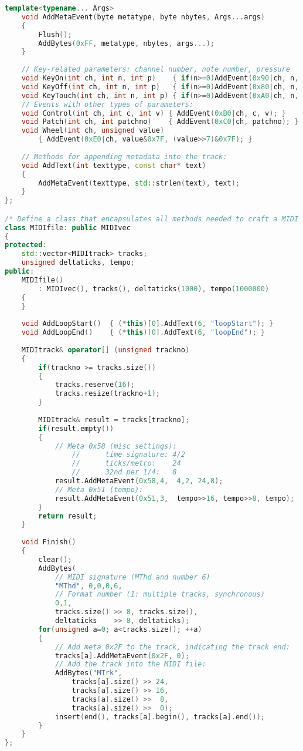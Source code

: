 \documentclass[a4paper]{report}
\begin{document}
\begin{lstlisting}[language=C++, caption=CPP MIDI,captionpos=b]
    template<typename... Args>
    void AddMetaEvent(byte metatype, byte nbytes, Args...args)
    {
        Flush();
        AddBytes(0xFF, metatype, nbytes, args...);
    }
    
    // Key-related parameters: channel number, note number, pressure
    void KeyOn(int ch, int n, int p)    { if(n>=0)AddEvent(0x90|ch, n, p); }
    void KeyOff(int ch, int n, int p)   { if(n>=0)AddEvent(0x80|ch, n, p); }
    void KeyTouch(int ch, int n, int p) { if(n>=0)AddEvent(0xA0|ch, n, p); }
    // Events with other types of parameters:
    void Control(int ch, int c, int v) { AddEvent(0xB0|ch, c, v); }
    void Patch(int ch, int patchno)    { AddEvent(0xC0|ch, patchno); }
    void Wheel(int ch, unsigned value)
        { AddEvent(0xE0|ch, value&0x7F, (value>>7)&0x7F); }
    
    // Methods for appending metadata into the track:
    void AddText(int texttype, const char* text)
    {
        AddMetaEvent(texttype, std::strlen(text), text);
    }
};

/* Define a class that encapsulates all methods needed to craft a MIDI file. */
class MIDIfile: public MIDIvec
{
protected:
    std::vector<MIDItrack> tracks;
    unsigned deltaticks, tempo;
public:
    MIDIfile()
        : MIDIvec(), tracks(), deltaticks(1000), tempo(1000000)
    {
    }
    
    void AddLoopStart()  { (*this)[0].AddText(6, "loopStart"); }
    void AddLoopEnd()    { (*this)[0].AddText(6, "loopEnd"); }
    
    MIDItrack& operator[] (unsigned trackno)
    {
        if(trackno >= tracks.size())
        {
            tracks.reserve(16);
            tracks.resize(trackno+1);
        }
        
        MIDItrack& result = tracks[trackno];
        if(result.empty())
        {
            // Meta 0x58 (misc settings):
                //      time signature: 4/2
                //      ticks/metro:    24
                //      32nd per 1/4:   8
            result.AddMetaEvent(0x58,4,  4,2, 24,8);
            // Meta 0x51 (tempo):
            result.AddMetaEvent(0x51,3,  tempo>>16, tempo>>8, tempo);
        }
        return result;
    }
    
    void Finish()
    {
        clear();
        AddBytes(
            // MIDI signature (MThd and number 6)
            "MThd", 0,0,0,6,
            // Format number (1: multiple tracks, synchronous)
            0,1,
            tracks.size() >> 8, tracks.size(),
            deltaticks    >> 8, deltaticks);
        for(unsigned a=0; a<tracks.size(); ++a)
        {
            // Add meta 0x2F to the track, indicating the track end:
            tracks[a].AddMetaEvent(0x2F, 0);
            // Add the track into the MIDI file:
            AddBytes("MTrk",
                tracks[a].size() >> 24,
                tracks[a].size() >> 16,
                tracks[a].size() >>  8,
                tracks[a].size() >>  0);
            insert(end(), tracks[a].begin(), tracks[a].end());
        }
    }
};


\end{lstlisting}
\end{document}
